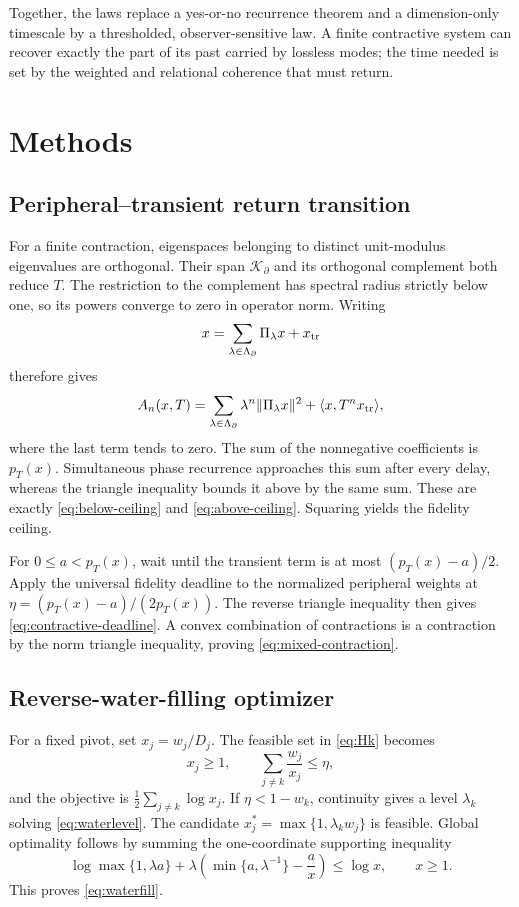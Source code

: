 \documentclass[10pt]{article}
\theoremstyle{definition}
\begin{document}
Together, the laws replace a yes-or-no recurrence theorem and a
dimension-only timescale by a thresholded, observer-sensitive law.  A finite
contractive system can recover exactly the part of its past carried by
lossless modes; the time needed is set by the weighted and relational
coherence that must return.

\section*{Methods}

\subsection*{Peripheral--transient return transition}

For a finite contraction, eigenspaces belonging to distinct unit-modulus
eigenvalues are orthogonal.  Their span \(\mathcal K_\partial\) and its
orthogonal complement both reduce \(T\).  The restriction to the complement
has spectral radius strictly below one, so its powers converge to zero in
operator norm.  Writing
\[
 x=\sum_{\lambda\in\Lambda_\partial}\Pi_\lambda x+x_{\rm tr}
\]
therefore gives
\[
 A_n(x,T)=\sum_{\lambda\in\Lambda_\partial}
   \lambda^n\|\Pi_\lambda x\|^2
   +\langle x,T^nx_{\rm tr}\rangle,
\]
where the last term tends to zero.  The sum of the nonnegative coefficients
is \(p_T(x)\).  Simultaneous phase recurrence approaches this sum after every
delay, whereas the triangle inequality bounds it above by the same sum.
These are exactly \eqref{eq:below-ceiling} and
\eqref{eq:above-ceiling}.  Squaring yields the fidelity ceiling.

For \(0\leq a<p_T(x)\), wait until the transient term is at most
\((p_T(x)-a)/2\).  Apply the universal fidelity deadline to the normalized
peripheral weights at
\(\eta=(p_T(x)-a)/(2p_T(x))\).  The reverse triangle inequality then gives
\eqref{eq:contractive-deadline}.  A convex combination of contractions is a
contraction by the norm triangle inequality, proving
\eqref{eq:mixed-contraction}.

\subsection*{Reverse-water-filling optimizer}

For a fixed pivot, set \(x_j=w_j/D_j\).  The feasible set in
\eqref{eq:Hk} becomes
\[
 x_j\geq1,\qquad \sum_{j\ne k}\frac{w_j}{x_j}\leq\eta,
\]
and the objective is \(\frac12\sum_{j\ne k}\log x_j\).  If
\(\eta<1-w_k\), continuity gives a level \(\lambda_k\) solving
\eqref{eq:waterlevel}.  The candidate
\(x_j^*=\max\{1,\lambda_kw_j\}\) is feasible.  Global optimality follows by
summing the one-coordinate supporting inequality
\[
 \log\max\{1,\lambda a\}
 +\lambda\!\left(\min\{a,\lambda^{-1}\}-\frac{a}{x}\right)
 \leq\log x,\qquad x\geq1.
\]
This proves \eqref{eq:waterfill}.
\end{document}
